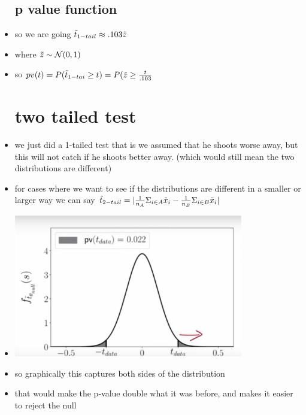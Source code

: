 \documentclass{article}
\begin{document}
\begin{itemize}
\subsection{p value function}
\item so we are going $\Tilde{t}_{1-tail}\approx .103\Tilde{z}$
\item where $\Tilde{z}\sim \mathcal{N}(0,1)$ 
\item so $pv(t)=P(\Tilde{t}_{1-tai}\geq t)=P(\Tilde{z}\geq \frac{t}{.103}$ 
\section{two tailed test}
\item we just did a 1-tailed test that is we assumed that he shoots worse away, but this will not catch if he shoots better away. (which would still mean the two distributions are different)
\item for cases where we want to see if the distributions are different in a smaller or larger way we can say $\Tilde{t}_{2-tail}=|\frac{1}{n_A}\Sigma_{i\in A}\Tilde{x}_{i}-\frac{1}{n_{B}}\Sigma_{i\in B}\Tilde{x}_i|$
\item \includegraphics[width=10cm]{notes/week_6/vidio 2: A Two-Sample Test for Antetokounmpo's Free Throws/immages/v1_3.jpg}
\item so graphically this captures both sides of the distribution 
\item that would make the p-value double what it was before, and makes it easier to reject the null

\end{itemize}
\end{document}
